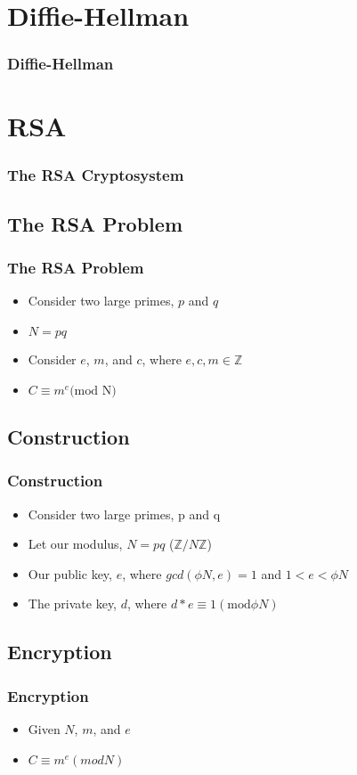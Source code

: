 \documentclass{beamer}
\begin{document}
\section{Diffie-Hellman}
\begin{frame}
    \frametitle{Diffie-Hellman}
\end{frame}


\section{RSA}
\begin{frame}
    \frametitle{The RSA Cryptosystem}
\end{frame}
\subsection{The RSA Problem}
\begin{frame}
    \frametitle{The RSA Problem}
    \begin{itemize}
        \item Consider two large primes, $p$ and $q$
        \item $N = pq$
        \item Consider $e$, $m$, and $c$, where $e,c, m \in \mathbb{Z}$
        \item $C \equiv m^{e} \textrm{(mod N)}$
    \end{itemize}
\end{frame}
\subsection{Construction}
\begin{frame}
    \frametitle{Construction}
    \begin{itemize}
        \item Consider two large primes, p and q
        \item Let our modulus, $N = pq$ ($\mathbb{Z}/N\mathbb{Z}$)
        \item Our public key, $e$, where $gcd(\phi{N},e) = 1$ and $1 < e < \phi{N}$
        \item The private key, $d$, where $d*e \equiv 1 (\textrm{mod} \phi{N})$
    \end{itemize}
\end{frame}

\subsection{Encryption}
\begin{frame}
    \frametitle{Encryption}
    \begin{itemize}
        \item Given $N$, $m$, and $e$
        \item $C \equiv m^{e} (mod N)$
    \end{itemize}
\end{frame}
\end{document}
